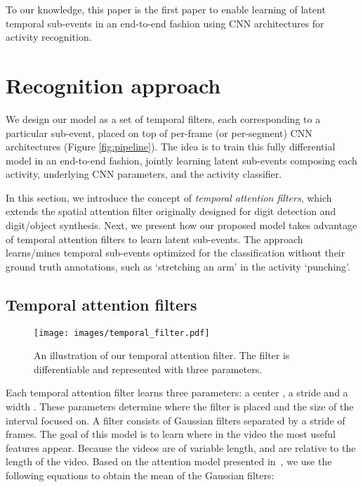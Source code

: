 \documentclass[letterpaper]{article}
\begin{document}
To our knowledge, this paper is the first paper to enable learning of latent temporal sub-events in an end-to-end fashion using CNN architectures for activity recognition.













\section{Recognition approach}
\label{sec:approach}

We design our model as a set of temporal filters, each corresponding to a particular sub-event, placed on top of per-frame (or per-segment) CNN architectures (Figure \ref{fig:pipeline}). The idea is to train this fully differential model in an end-to-end fashion, jointly learning latent sub-events composing each activity, underlying CNN parameters, and the activity classifier.

In this section, we introduce the concept of \emph{temporal attention filters}, which extends the spatial attention filter \cite{attention15} originally designed for digit detection and digit/object synthesis. Next, we present how our proposed model takes advantage of temporal attention filters to learn latent sub-events. The approach learns/mines temporal sub-events optimized for the classification without their ground truth annotations, such as `stretching an arm' in the activity `punching'.

\subsection{Temporal attention filters}

\begin{figure}[b]
\begin{center}
   \texttt{[image: images/temporal\_filter.pdf]}
\end{center}
   \caption{An illustration of our temporal attention filter. The filter is differentiable and represented with three parameters.}
\label{fig:filter}		
\end{figure}

Each temporal attention filter learns three parameters: a center , a stride  and a width . These parameters determine where the filter is placed and the size of the interval focused on. A filter consists of  Gaussian filters separated by a stride of  frames. The goal of this model is to learn where in the video the most useful features appear. Because the videos are of variable length,  and  are relative to the length of the video. Based on the attention model presented in~\cite{attention15}, we use the following equations to obtain the mean of the Gaussian filters:
\end{document}
